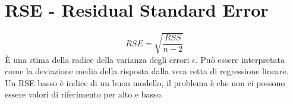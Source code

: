 \section{RSE - Residual Standard Error}
\[ RSE = \sqrt{\frac{RSS}{n - 2}} \]
\`E una stima della radice della varianza degli errori $\epsilon$. Pu\`o essere 
interpretata come la deviazione media della risposta dalla vera retta di 
regressione lineare.\\
Un RSE basso \`e indice di un buon modello, il problema \`e che non ci possono 
essere valori di riferimento per alto e basso.
